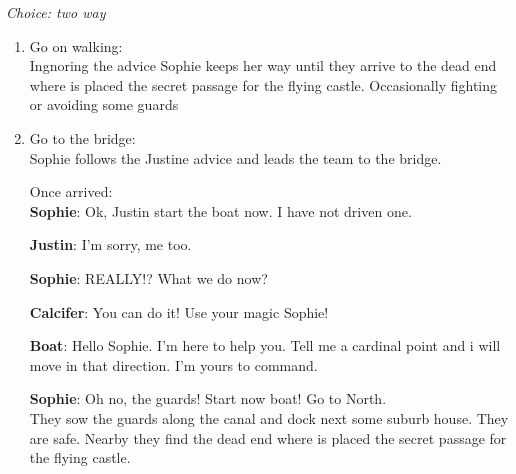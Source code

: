 \textit{Choice: two way}
\begin{enumerate}
\item Go on walking:\\
  Ingnoring the advice Sophie keeps her way until they arrive to the dead end where is placed the secret passage for the flying castle. Occasionally fighting or avoiding some guards
  \item Go to the bridge:\\
    Sophie follows the Justine advice and leads the team to the bridge.
    
Once arrived:\\

\textbf{Sophie}: Ok, Justin start the boat now. I have not driven one.

\textbf{Justin}: I’m sorry, me too.

\textbf{Sophie}: REALLY!? What we do now?

\textbf{Calcifer}: You can do it! Use your magic Sophie!

\textbf{Boat}: Hello Sophie. I’m here to help you. Tell me a cardinal point and i will move in that direction. I’m yours to command.

\textbf{Sophie}: Oh no, the guards! Start now boat! Go to North.\\

\noindent They sow the guards along the canal and dock next some suburb house. They are safe. Nearby they find the dead end where is placed the secret passage for the flying castle.
\end{enumerate}















